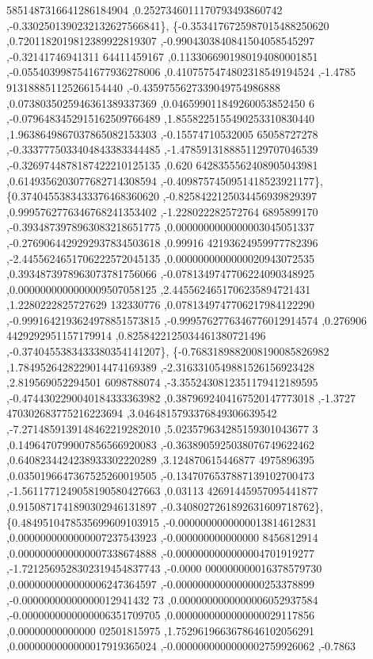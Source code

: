\begin{DoxyCode}
      5851487316641286184904 ,0.2527346011170793493860742 ,-0.3302501390232132627566841\},
\{-0.3534176725987015488250620 ,0.7201182019812389922819307 ,-0.9904303840841504058545297 ,-0.32141746941311
      64411459167 ,0.1133066901980194080001851 ,-0.0554039987541677936278006 ,0.4107575474802318549194524 ,-1.4785
      913188851125266154440 ,-0.4359755627339049754986888 ,0.0738035025946361389337369 ,0.046599011849260053852450
      6 ,-0.0796483452915162509766489 ,1.8558225155490253310830440 ,1.9638649867037865082153303 ,-0.15574710532005
      65058727278 ,-0.3337775033404843383344485 ,-1.4785913188851129707046539 ,-0.3269744878187422210125135 ,0.620
      6428355562408905043981 ,0.6149356203077682714308594 ,-0.4098757450951418523921177\},
\{0.3740455383433376468360620 ,-0.8258422125034456939829397 ,0.9995762776346768241353402 ,-1.228022282572764
      6895899170 ,-0.3934873978963083218651775 ,0.0000000000000003045051337 ,-0.2769064429292937834503618 ,0.99916
      42193624959977782396 ,-2.4455624651706222572045135 ,0.0000000000000020943072535 ,0.3934873978963073781756066
       ,-0.0781349747706224090348925 ,0.0000000000000009507058125 ,2.4455624651706235894721431 ,1.2280222825727629
      132330776 ,0.0781349747706217984122290 ,-0.9991642193624978851573815 ,-0.9995762776346776012914574 ,0.276906
      4429292951157179914 ,0.8258422125034461380721496 ,-0.3740455383433380354141207\},
\{-0.7683189882008190085826982 ,1.7849526428229014474169389 ,-2.3163310549881526156923428 ,2.819569052294501
      6098788074 ,-3.3552430812351179412189595 ,-0.4744302290040184333363982 ,0.3879692404167520147773018 ,-1.3727
      470302683775216223694 ,3.0464815793376849306639542 ,-7.2714859139148462219282010 ,5.023579634285159301043677
      3 ,0.1496470799007856566920083 ,-0.3638905925038076749622462 ,0.6408234424238933302220289 ,3.124870615446877
      4975896395 ,0.0350196647367525260019505 ,-0.1347076537887139102700473 ,-1.5611771249058190580427663 ,0.03113
      42691445957095441877 ,0.9150871741890302946131897 ,-0.3408027261892631609718762\},
\{0.4849510478535699609103915 ,-0.0000000000000013814612831 ,0.0000000000000007237543923 ,-0.000000000000000
      8456812914 ,0.0000000000000007338674888 ,-0.0000000000000004701919277 ,-1.7212569528302319454837743 ,-0.0000
      000000000016378579730 ,0.0000000000000006247364597 ,-0.0000000000000000253378899 ,-0.00000000000000012941432
      73 ,0.0000000000000006052937584 ,-0.0000000000000006351709705 ,0.0000000000000000029117856 ,0.00000000000000
      02501815975 ,1.7529619663678646102056291 ,0.0000000000000017919365024 ,-0.0000000000000002759926062 ,-0.7863

\end{DoxyCode}
